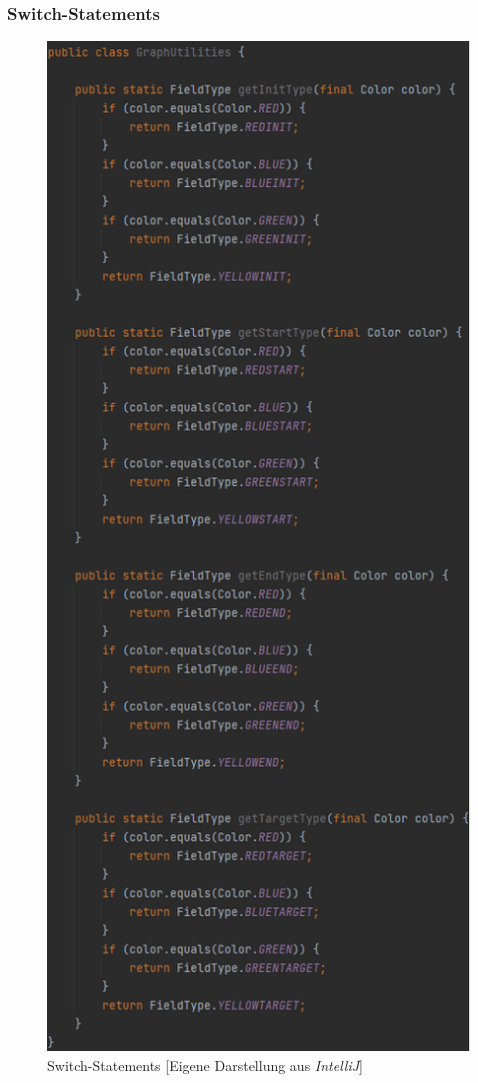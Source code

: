 \newpage

\subsubsection{Switch-Statements}

\begin{figure}[htbp]
\centering
\centerline{\includegraphics[scale=.55]{graphutilities}}
\caption{Switch-Statements [Eigene Darstellung aus \emph{IntelliJ}]}
\label{fig:graphutilities}
\end{figure}

